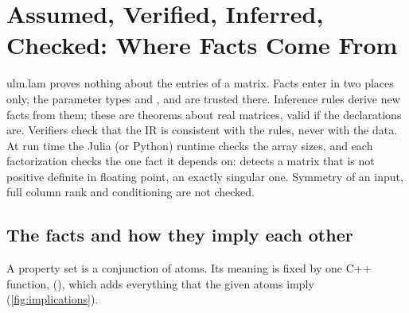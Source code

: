 \chapter{Assumed, Verified, Inferred, Checked: Where Facts Come From}
\label{ch:facts}

\begin{answer}
ulm.lam proves nothing about the entries of a matrix. Facts enter in two
places only, the parameter types and , and are trusted there.
Inference rules derive new facts from them; these are theorems about real
matrices, valid if the declarations are. Verifiers check that the IR is
consistent with the rules, never with the data. At run time the Julia (or
Python) runtime checks the array sizes, and each factorization checks the
one fact it depends on:  detects a matrix that is not positive
definite in floating point,  an exactly singular one. Symmetry
of an input, full column rank and conditioning are not checked.
\end{answer}

\section{The facts and how they imply each other}
\label{sec:facts-lattice}

A property set is a conjunction of atoms. Its meaning is fixed by one C++
function,  (), which
adds everything that the given atoms imply (\cref{fig:implications}).

